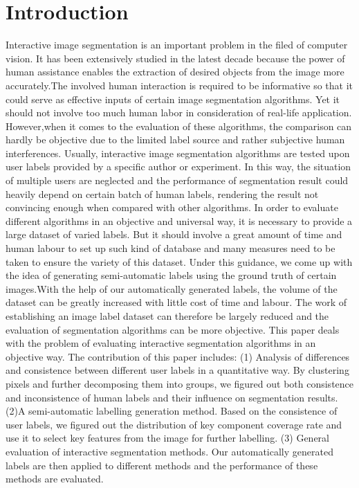 \documentclass[runningheads,a4paper]{llncs}
\begin{document}
\section{Introduction}

Interactive image segmentation is an important problem in the filed of computer vision. It has been extensively studied in the latest decade because the power of human assistance enables the extraction of desired objects from the image more accurately.The involved human interaction is required to be informative so that it could serve as effective inputs of certain image segmentation algorithms. Yet it should not involve too much human labor in consideration of real-life application. However,when it comes to the evaluation of these algorithms, the comparison can hardly be objective due to the limited label source and rather subjective human interferences. Usually, interactive image segmentation algorithms are tested upon user labels provided by a specific author or experiment. In this way, the situation of multiple users are neglected and the performance of segmentation result could heavily depend on certain batch of human labels, rendering the result not convincing enough when compared with other algorithms. In order to evaluate different algorithms in an objective and universal way, it is necessary to provide a large dataset of varied labels. But it should involve a great amount of time and human labour to set up such kind of database and many measures need to be taken to ensure the variety of this dataset. Under this guidance, we come up with the idea of generating semi-automatic labels using the ground truth of certain images.With the help of our automatically generated labels, the volume of the dataset can be greatly increased with little cost of time and labour. The work of establishing an image label dataset can therefore be largely reduced and the evaluation of segmentation algorithms can  be more objective.
This paper deals with the problem of evaluating interactive segmentation algorithms in an objective way. The contribution of this paper includes: (1)  Analysis of differences and consistence between different user labels in a quantitative way. By clustering pixels and further decomposing them into groups, we figured out both consistence and inconsistence of human labels and their influence on segmentation results.(2)A semi-automatic labelling generation method. Based on the consistence of user labels, we figured out the distribution of key component coverage rate and use it to select key features from the image for further labelling. (3) General evaluation of interactive segmentation methods. Our automatically generated labels are then applied to different methods and the performance of these methods are evaluated.
\end{document}
